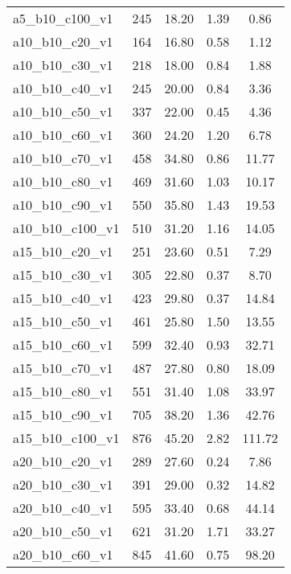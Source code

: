 \documentclass[a4paper]{article}
\begin{document}
\begin{table}[h!]
\begin{tabular}{@{} l c S[table-format=2.2] S[table-format=1.2] S[table-format=1.2] @{}}
        a5\_b10\_c100\_v1 & 245  & 18.20 & 1.39 & 0.86 \\ 
        a10\_b10\_c20\_v1 & 164  & 16.80 & 0.58 & 1.12 \\ 
        a10\_b10\_c30\_v1 & 218  & 18.00 & 0.84 & 1.88 \\ 
        a10\_b10\_c40\_v1 & 245  & 20.00 & 0.84 & 3.36 \\ 
        a10\_b10\_c50\_v1 & 337  & 22.00 & 0.45 & 4.36 \\ 
        a10\_b10\_c60\_v1 & 360  & 24.20 & 1.20 & 6.78 \\ 
        a10\_b10\_c70\_v1 & 458  & 34.80 & 0.86 & 11.77 \\ 
        a10\_b10\_c80\_v1 & 469  & 31.60 & 1.03 & 10.17 \\ 
        a10\_b10\_c90\_v1 & 550  & 35.80 & 1.43 & 19.53 \\ 
        a10\_b10\_c100\_v1 & 510  & 31.20 & 1.16 & 14.05 \\ 
        a15\_b10\_c20\_v1 & 251  & 23.60 & 0.51 & 7.29 \\ 
        a15\_b10\_c30\_v1 & 305  & 22.80 & 0.37 & 8.70 \\ 
        a15\_b10\_c40\_v1 & 423  & 29.80 & 0.37 & 14.84 \\ 
        a15\_b10\_c50\_v1 & 461  & 25.80 & 1.50 & 13.55 \\ 
        a15\_b10\_c60\_v1 & 599  & 32.40 & 0.93 & 32.71 \\ 
        a15\_b10\_c70\_v1 & 487  & 27.80 & 0.80 & 18.09 \\ 
        a15\_b10\_c80\_v1 & 551  & 31.40 & 1.08 & 33.97 \\ 
        a15\_b10\_c90\_v1 & 705  & 38.20 & 1.36 & 42.76 \\ 
        a15\_b10\_c100\_v1 & 876  & 45.20 & 2.82 & 111.72 \\ 
        a20\_b10\_c20\_v1 & 289  & 27.60 & 0.24 & 7.86 \\ 
        a20\_b10\_c30\_v1 & 391  & 29.00 & 0.32 & 14.82 \\ 
        a20\_b10\_c40\_v1 & 595  & 33.40 & 0.68 & 44.14 \\ 
        a20\_b10\_c50\_v1 & 621  & 31.20 & 1.71 & 33.27 \\ 
        a20\_b10\_c60\_v1 & 845  & 41.60 & 0.75 & 98.20 \\ 

\end{tabular}
\end{table}
\end{document}
